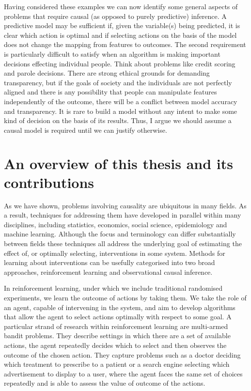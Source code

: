 \documentclass[11pt,a4paper,oneside]{book}
\theoremstyle{plain}
\theoremstyle{definition}
\begin{document}
Having considered these examples we can now identify some general aspects of problems that require causal (as opposed to purely predictive) inference. A predictive model may be sufficient if, given the variable(s) being predicted, it is clear which action is optimal and if selecting actions on the basis of the model does not change the mapping from features to outcomes. The second requirement is particularly difficult to satisfy when an algorithm is making important decisions effecting individual people. Think about problems like credit scoring and parole decisions. There are strong ethical grounds for demanding transparency, but if the goals of society and the individuals are not perfectly aligned and there is any possibility that people can manipulate features independently of the outcome, there will be a conflict between model accuracy and transparency. It is rare to build a model without any intent to make some kind of decision on the basis of its results. Thus, I argue we should assume a causal model is required until we can justify otherwise.  

\section{An overview of this thesis and its contributions}

As we have shown, problems involving causality are ubiquitous in many fields. As a result, techniques for addressing them have developed in parallel within many disciplines, including statistics, economics, social science, epidemiology and machine learning. Although the focus and terminology can differ substantially between fields these techniques all address the underlying goal of estimating the effect of, or optimally selecting, interventions in some system. Methods for learning about interventions can be usefully categorised into two broad approaches, reinforcement learning and observational causal inference. 

In reinforcement learning, under which we include traditional randomised experiments, we learn the outcome of actions by taking them. We take the role of an agent, capable of intervening in the system, and aim to develop algorithms that allow the agent to select actions optimally with respect to some goal. A particular strand of research within reinforcement learning are multi-armed bandit problems. They describe settings in which there are a set of available actions, the agent repeatedly decides which to select and then observes the outcome of the chosen action. They capture problems such as a doctor deciding which treatment to prescribe to a patient or a search engine selecting which advertisement to display to a user, where the agent faces the same set of choices repeatedly and is able to assess the value of outcome of the actions. 
\end{document}
